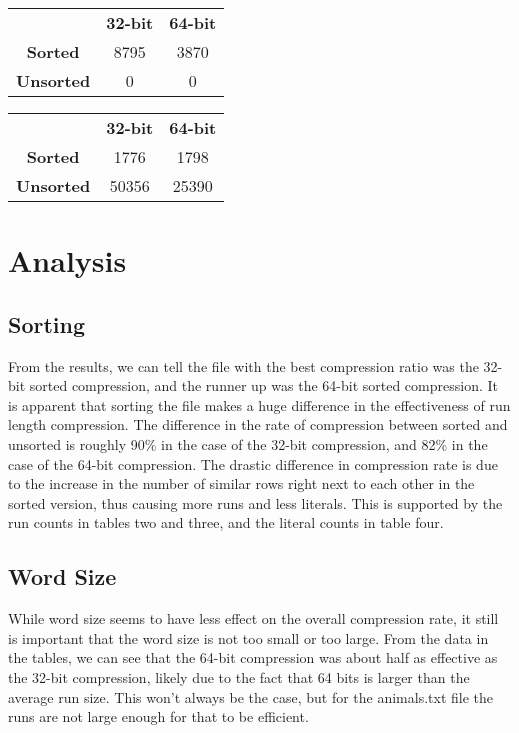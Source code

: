 \documentclass{article}
\begin{document}
\begin{center}
\begin{tabular}{ c c c}
 & \textbf{32-bit} & \textbf{64-bit} \\ 
 \textbf{Sorted} & 8795 & 3870 \\  
 \textbf{Unsorted} & 0 & 0
 
\end{tabular}
\end{center}

\begin{center}
\begin{tabular}{ c c c}
 & \textbf{32-bit} & \textbf{64-bit} \\ 
 \textbf{Sorted} & 1776 & 1798 \\  
 \textbf{Unsorted} & 50356 & 25390
 
\end{tabular}
\end{center}

\section{Analysis}

\subsection{Sorting}
From the results, we can tell the file with the best compression ratio was the 32-bit sorted compression, and the runner up was the 64-bit sorted compression. It is apparent that sorting the file makes a huge difference in the effectiveness of run length compression. The difference in the rate of compression between sorted and unsorted is roughly 90\% in the case of the 32-bit compression, and 82\% in the case of the 64-bit compression. The drastic difference in compression rate is due to the increase in the number of similar rows right next to each other in the sorted version, thus causing more runs and less literals. This is supported by the run counts in tables two and three, and the literal counts in table four.

\subsection{Word Size}

While word size seems to have less effect on the overall compression rate, it still is important that the word size is not too small or too large. From the data in the tables, we can see that the 64-bit compression was about half as effective as the 32-bit compression, likely due to the fact that 64 bits is larger than the average run size. This won't always be the case, but for the animals.txt file the runs are not large enough for that to be efficient.
\end{document}
